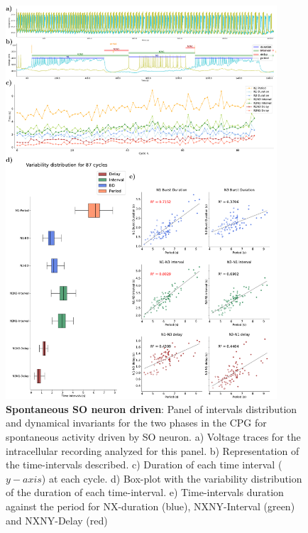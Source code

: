 \begin{figure}[htbp]
	\centering
	\includegraphics[width=0.9\textwidth]{./img/invariants/data/SUSSEX/prep4_so_driven_2/images/panel_with_intervals.pdf}
	\caption{\textbf{Spontaneous SO neuron driven}: Panel of intervals distribution and dynamical invariants for the two phases in the CPG for spontaneous activity driven by SO neuron. a) Voltage traces for the intracellular recording analyzed for this panel. b) Representation of the time-intervals described. c) Duration of each time interval ($y-axis$) at each cycle. d) Box-plot with the variability distribution of the duration of each time-interval. e) Time-intervals duration against the period for NX-duration (blue), NXNY-Interval (green) and NXNY-Delay (red)}
	\label{fig:so spontaneous invariants 2}
\end{figure}


